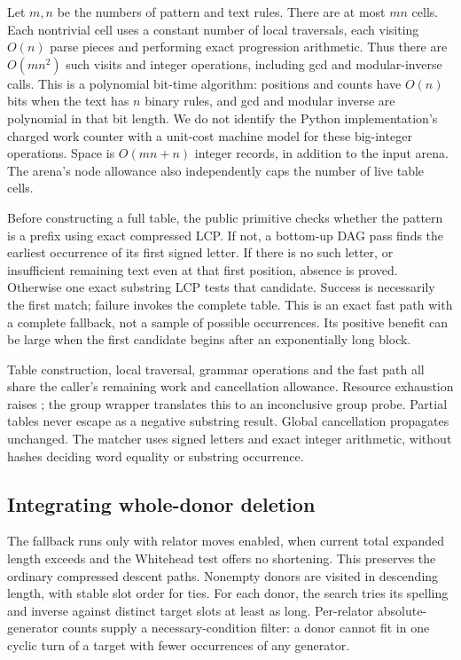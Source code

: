 Let $m,n$ be the numbers of pattern and text rules. There are at most $mn$
cells. Each nontrivial cell uses a constant number of local traversals,
each visiting $O(n)$ parse pieces and performing exact progression arithmetic.
Thus there are $O(mn^2)$ such visits and integer operations, including gcd
and modular-inverse calls. This is a polynomial bit-time algorithm:
positions and counts have $O(n)$ bits when the text has $n$ binary rules,
and gcd and modular inverse are polynomial in that bit length. We do not
identify the Python implementation's charged work counter with a unit-cost
machine model for these big-integer operations. Space is $O(mn+n)$ integer
records, in addition to the input arena. The arena's node allowance also
independently caps the number of live table cells.

Before constructing a full table, the public primitive checks whether the
pattern is a prefix using exact compressed LCP. If not, a bottom-up DAG
pass finds the earliest occurrence of its first signed letter. If there
is no such letter, or insufficient remaining text even at that first
position, absence is proved. Otherwise one exact substring LCP tests that
candidate. Success is necessarily the first match; failure invokes the
complete table. This is an exact fast path with a complete fallback, not
a sample of possible occurrences. Its positive benefit can be large when
the first candidate begins after an exponentially long block.

Table construction, local traversal, grammar operations and the fast path
all share the caller's remaining work and cancellation allowance. Resource
exhaustion raises ; the group wrapper translates this
to an inconclusive group probe. Partial tables never escape as a negative
substring result. Global cancellation propagates unchanged. The matcher
uses signed letters and exact integer arithmetic, without hashes deciding
word equality or substring occurrence.

\subsection{Integrating whole-donor deletion}

The fallback runs only with relator moves enabled, when current total
expanded length exceeds  and the Whitehead test offers
no shortening. This preserves the ordinary compressed descent paths.
Nonempty donors are visited in descending length, with stable slot order
for ties. For each donor, the search tries its spelling and inverse against
distinct target slots at least as long. Per-relator absolute-generator counts
supply a necessary-condition filter: a donor cannot fit in one cyclic turn
of a target with fewer occurrences of any generator.

